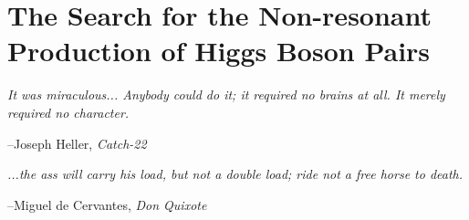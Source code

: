 \chapter{The Search for the Non-resonant Production of Higgs Boson Pairs}
\label{chap:search_hh}


\epigraph{
\textit{It was miraculous... Anybody could do it; it required no brains at all.
It merely required no character.}
}
{
--Joseph Heller, \textit{Catch-22}
}


\epigraph{
\textit{...the ass will carry his load, but not a double load; ride not a free horse to death.}
}
{
--Miguel de Cervantes, \textit{Don Quixote}
}

%
%

